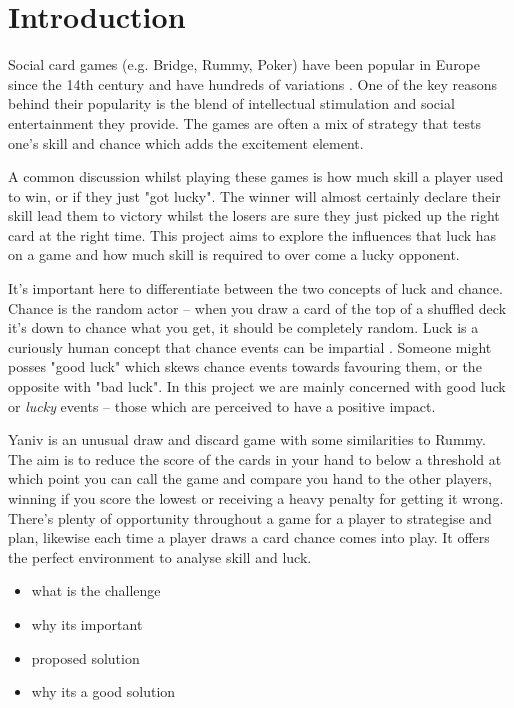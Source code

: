 \documentclass[../main.tex]{subfiles}
\begin{document}
\chapter{Introduction}
\label{cha:Introduction}

Social card games (e.g. Bridge, Rummy, Poker) have been popular in Europe since the 14th century and have hundreds of variations \cite{david_sidney_parlett_oxford_1990}. One of the key reasons behind their popularity is the blend of intellectual stimulation and social entertainment they provide. The games are often a mix of strategy that tests one's skill and chance which adds the excitement element.

A common discussion whilst playing these games is how much skill a player used to win, or if they just "got lucky". The winner will almost certainly declare their skill lead them to victory whilst the losers are sure they just picked up the right card at the right time. This project aims to explore the influences that luck has on a game and how much skill is required to over come a lucky opponent. 

It's important here to differentiate between the two concepts of luck and chance. Chance is the random actor -- when you draw a card of the top of a shuffled deck it's down to chance what you get, it should be completely random. Luck is a curiously human concept that chance events can be impartial \cite{levinson_chance_2001}. Someone might posses "good luck" which skews chance events towards favouring them, or the opposite with "bad luck". In this project we are mainly concerned with good luck or \textit{lucky} events -- those which are perceived to have a positive impact. 

Yaniv is an unusual draw and discard game with some similarities to Rummy. The aim is to reduce the score of the cards in your hand to below a threshold at which point you can call the game and compare you hand to the other players, winning if you score the lowest or receiving a heavy penalty for getting it wrong. There's plenty of opportunity throughout a game for a player to strategise and plan, likewise each time a player draws a card chance comes into play. It offers the perfect environment to analyse skill and luck. 

\begin{itemize}[nosep]
    \item what is the challenge
    \item why its important
    \item proposed solution
    \item why its a good solution
\end{itemize}
\end{document}
